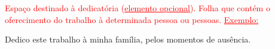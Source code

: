 
\begin{dedicatoria}%

\textcolor{red}{Espaço destinado à dedicatória (\underline{elemento opcional}). 
Folha que contém o oferecimento do trabalho à determinada pessoa ou pessoas. \underline{Exemplo:}}
\vspace{1cm}

Dedico este trabalho à minha família, pelos momentos de ausência.

\end{dedicatoria}
